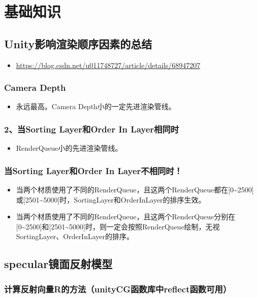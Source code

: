 \documentclass[9pt, b5paper]{article}
\begin{document}
\section{基础知识}
\label{sec-3}
\subsection{Unity影响渲染顺序因素的总结}
\label{sec-3-1}
\begin{itemize}
\item \url{https://blog.csdn.net/u011748727/article/details/68947207}
\end{itemize}
\subsubsection{Camera Depth}
\label{sec-3-1-1}
\begin{itemize}
\item 永远最高。Camera Depth小的一定先进渲染管线。
\end{itemize}
\subsubsection{2、当Sorting Layer和Order In Layer相同时}
\label{sec-3-1-2}
\begin{itemize}
\item RenderQueue小的先进渲染管线。
\end{itemize}
\subsubsection{当Sorting Layer和Order In Layer不相同时！}
\label{sec-3-1-3}
\begin{itemize}
\item 当两个材质使用了不同的RenderQueue，且这两个RenderQueue都在[0\textasciitilde{}2500]或[2501\textasciitilde{}5000]时，SortingLayer和OrderInLayer的排序生效。
\item 当两个材质使用了不同的RenderQueue，且这两个RenderQueue分别在[0\textasciitilde{}2500]和[2501\textasciitilde{}5000]时，则一定会按照RenderQueue绘制，无视SortingLayer、OrderInLayer的排序。
\end{itemize}

\subsection{specular镜面反射模型}
\label{sec-3-2}
\subsubsection{计算反射向量R的方法（unityCG函数库中reflect函数可用）}
\label{sec-3-2-1}
\end{document}
